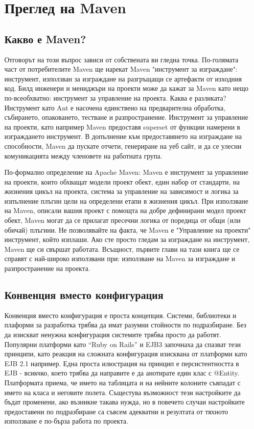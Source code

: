 \section{Преглед на Maven}
\subsection{Какво е Maven?} 
Отговорът на този въпрос зависи от собствената ви
гледна точка. По-голямата част от потребителите Maven ще нарекат Maven
"инструмент за изграждане": инструмент, използван за изграждане на
разгръщащи се артефакти от изходния код. Билд инженери и мениджъри на
проекти може да кажат за Maven като нещо по-всеобхватно: инструмент за
управление на проекта. Каква е разликата? Инструмент като Ant е
насочена единствено на предварителна обработка, събирането,
опаковането, тестване и разпространение. Инструмент за управление на
проекти, като например Maven предоставя superset от функции намерени в
изграждането инструмент. В допълнение към предоставянето на изграждане
на способности, Maven да пускате отчети, генериране на уеб сайт, и да
се улесни комуникацията между членовете на работната група.

По-формално определение на Apache Maven: Maven е инструмент за
управление на проекти, които обхващат модели проект обект, един набор
от стандарти, на жизнения цикъл на проекта, система за управление на
зависимост и логика за изпълнение плъгин цели на определени етапи в
жизнения цикъл. При използване на Maven, описали вашия проект с
помощта на добре дефинирани модел проект обект, Maven могат да се
прилагат пресечни логика от поредица от общи (или обичай) плъгини.  Не
позволявайте на факта, че Maven е "Управление на проекти" инструмент,
който изплаши. Ако сте просто гледам за изграждане на инструмент,
Maven ще си свършат работата. Всъщност, първите глави на тази книга ще
се справят с най-широко използвани при: използване на Maven за
изграждане и разпространение на проекта.
\subsection{Конвенция вместо конфигурация}
Конвенция вместо конфигурация е проста концепция. Системи, библиотеки
и плаформи за разработка  
трябва да имат разумни стойности по подразбиране. Без да изискват
ненужна конфигурация системите трябва просто да работят. Популярни
платформи като "`Ruby on Rails"' и EJB3 започнаха да спазват тези
принципи, като реакция на сложната конфигурация изисквана от платформи
като EJB 2.1 например. Една проста илюстрация на принцип е
персистентността в EJB - всикчко, което трябва да направите е да
анотирате един клас с @Entity. Платформата приема, че името на
таблицата и на нейните колоните съвпадат с името на класа и неговите
полета. Същестува възможност тези настройките да бъдат променени, ако
възникне такава нужда, но в повечето случаи настройките предоставени
по подразбиране са съвсем адекватни и резултата от тяхното използване
е по-бърза работа по проекта.


